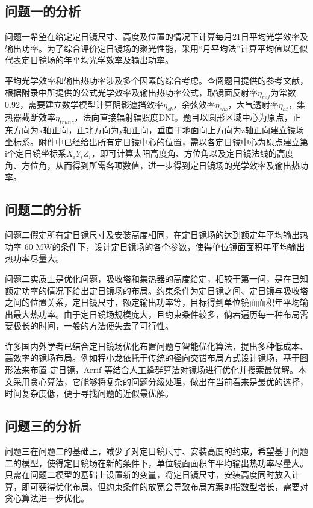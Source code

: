\documentclass[withoutpreface,bwprint]{cumcmthesis}
\begin{document}
\subsection{问题一的分析}
问题一希望在给定定日镜尺寸、高度及位置的情况下计算每月21日平均光学效率及输出功率。为了综合评价定日镜场的聚光性能，采用“月平均法”计算平均值以近似代表定日镜场的年平均光学效率及输出功率。

平均光学效率和输出热功率涉及多个因素的综合考虑。查阅题目提供的参考文献，根据附录中所提供的公式光学效率及输出热功率公式，取镜面反射率$\eta _{ref}$为常数0.92，需要建立数学模型计算阴影遮挡效率$\eta _{sb}$，余弦效率$\eta _{cos}$，大气透射率$\eta _{at}$，集热器截断效率$\eta _{trunc}$，法向直接辐射辐照度DNI。题目以圆形区域中心为原点，正东方向为x轴正向，正北方向为y轴正向，垂直于地面向上方向为z轴正向建立镜场坐标系。附件中已经给出所有定日镜中心的位置，需以各定日镜中心为原点建立第i个定日镜坐标系$X_iY_iZ_i$，即可计算太阳高度角、方位角以及定日镜法线的高度角、方位角，从而得到所需各项数值，进一步得到定日镜场的光学效率及输出热功率。

\subsection{问题二的分析}
问题二假定所有定日镜尺寸及安装高度相同，在定日镜场的达到额定年平均输出热功率 60 MW的条件下，设计定日镜场的各个参数，使得单位镜面面积年平均输出热功率尽量大。

问题二实质上是优化问题，吸收塔和集热器的高度给定，相较于第一问，是在已知额定功率的情况下给出定日镜场的布局。约束条件为定日镜之间、定日镜与吸收塔之间的位置关系，定日镜尺寸，额定输出功率等，目标得到单位镜面面积年平均输出最大热功率。由于定日镜场规模庞大，且约束条件较多，倘若遍历每一种布局需要极长的时间，一般的方法便失去了可行性。

许多国内外学者已结合定日镜场优化布置问题与智能优化算法，提出多种低成本、高效率的镜场布局。例如程小龙依托于传统的径向交错布局方式设计镜场，基于图形法来布置
定日镜，Arrif 等结合人工蜂群算法对镜场进行优化并搜索最优解。本文采用贪心算法，它能够将复杂的问题分级处理，做出在当前看来是最优的选择，时间复杂度低，便于寻找问题的近似最优解。

\subsection{问题三的分析}
问题三在问题二的基础上，减少了对定日镜尺寸、安装高度的约束，希望基于问题二的模型，使得定日镜场在新的条件下，单位镜面面积年平均输出热功率尽量大。只需在问题二模型的基础上设置新的变量，将定日镜尺寸，安装高度同时放入计算，即可获得优化布局。但约束条件的放宽会导致布局方案的指数型增长，需要对贪心算法进一步优化。
\end{document}

